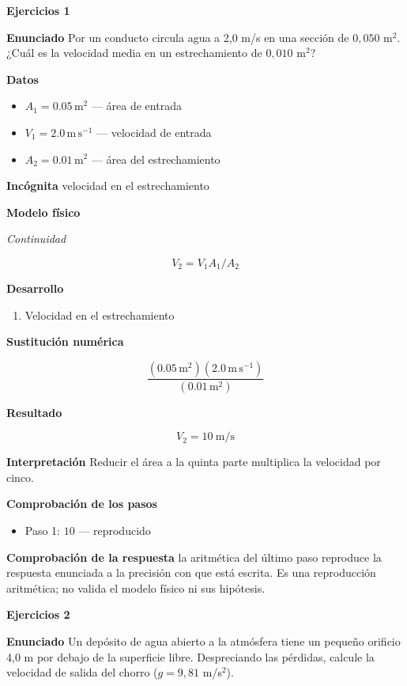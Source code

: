 \documentclass[10pt,openany]{book}
\begin{document}
\noindent\textbf{Ejercicios 1}

\noindent\textbf{Enunciado}
Por un conducto circula agua a 2,0 m/s en una sección de \(0{,}050\) m\(^2\). ¿Cuál es la velocidad media en un estrechamiento de \(0{,}010\) m\(^2\)?

\noindent\textbf{Datos}
\begin{itemize}
\item $A_{1} = 0.05\,\mathrm{m}^{2}$ — área de entrada
\item $V_{1} = 2.0\,\mathrm{m}\,\mathrm{s}^{-1}$ — velocidad de entrada
\item $A_{2} = 0.01\,\mathrm{m}^{2}$ — área del estrechamiento
\end{itemize}

\noindent\textbf{Incógnita}
velocidad en el estrechamiento

\noindent\textbf{Modelo físico}

\noindent\textit{Continuidad}

\[
V_2 = V_1 A_1/A_2
\]

\noindent\textbf{Desarrollo}
\begin{enumerate}
\item
Velocidad en el estrechamiento
\end{enumerate}

\noindent\textbf{Sustitución numérica}

\[
\frac{\left(0.05\,\mathrm{m}^{2}\right) \left(2.0\,\mathrm{m}\,\mathrm{s}^{-1}\right)}{\left(0.01\,\mathrm{m}^{2}\right)}
\]

\noindent\textbf{Resultado}

\[
V_2 = 10\ \mathrm{m/s}
\]

\noindent\textbf{Interpretación}
Reducir el área a la quinta parte multiplica la velocidad por cinco.

\noindent\textbf{Comprobación de los pasos}
\begin{itemize}
\item Paso 1: $10$ — reproducido
\end{itemize}

\noindent\textbf{Comprobación de la respuesta} la aritmética del último paso reproduce la respuesta enunciada a la precisión con que está escrita. Es una reproducción aritmética; no valida el modelo físico ni sus hipótesis.

\noindent\textbf{Ejercicios 2}

\noindent\textbf{Enunciado}
Un depósito de agua abierto a la atmósfera tiene un pequeño orificio 4,0 m por debajo de la superficie libre. Despreciando las pérdidas, calcule la velocidad de salida del chorro (\(g = 9{,}81\) m/s\(^2\)).
\end{document}
